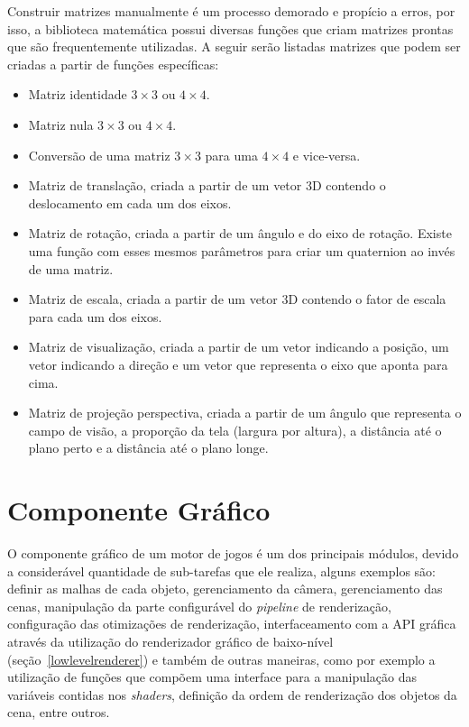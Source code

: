 Construir matrizes manualmente é um processo demorado e propício a erros, por isso, a 
biblioteca matemática possui diversas funções que criam matrizes prontas que são 
frequentemente utilizadas. A seguir serão listadas matrizes que podem ser criadas a 
partir de funções específicas:
\begin{itemize}
    \item Matriz identidade $3 \times 3$ ou $4 \times 4$.
    \item Matriz nula $3 \times 3$ ou $4 \times 4$.
    \item Conversão de uma matriz $3 \times 3$ para uma $4 \times 4$ e vice-versa.
    \item Matriz de translação, criada a partir de um vetor 3D contendo o deslocamento em 
        cada um dos eixos.
    \item Matriz de rotação, criada a partir de um ângulo e do eixo de rotação. Existe 
        uma função com esses mesmos parâmetros para criar um quaternion ao invés de uma 
        matriz.
    \item Matriz de escala, criada a partir de um vetor 3D contendo o fator de escala 
        para cada um dos eixos.
    \item Matriz de visualização, criada a partir de um vetor indicando a posição, um 
        vetor indicando a direção e um vetor que representa o eixo que aponta para cima.
    \item Matriz de projeção perspectiva, criada a partir de um ângulo que representa o 
        campo de visão, a proporção da tela (largura por altura), a distância até o 
        plano perto e a distância até o plano longe.
\end{itemize}

\section{Componente Gráfico}

O componente gráfico de um motor de jogos é um dos principais módulos, devido a 
considerável quantidade de sub-tarefas que ele realiza, alguns exemplos são: definir 
as malhas de cada objeto, gerenciamento da câmera, gerenciamento das cenas, 
manipulação da parte configurável do \textit{pipeline} de renderização, configuração 
das otimizações de renderização, interfaceamento com a API gráfica através da 
utilização do renderizador gráfico de baixo-nível (seção~\ref{lowlevelrenderer}) e 
também de outras maneiras, como por exemplo a utilização de funções que compõem uma 
interface para a manipulação das variáveis contidas nos \textit{shaders}, definição da 
ordem de renderização dos objetos da cena, entre outros. 

